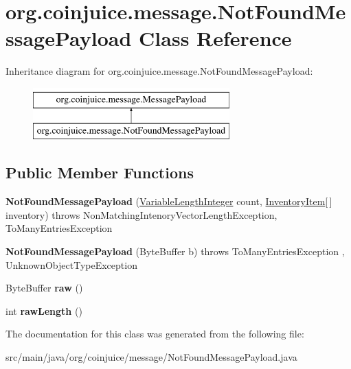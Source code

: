 \hypertarget{classorg_1_1coinjuice_1_1message_1_1_not_found_message_payload}{\section{org.\-coinjuice.\-message.\-Not\-Found\-Message\-Payload Class Reference}
\label{classorg_1_1coinjuice_1_1message_1_1_not_found_message_payload}
}
Inheritance diagram for org.\-coinjuice.\-message.\-Not\-Found\-Message\-Payload\-:\begin{figure}[H]
\begin{center}
\leavevmode
\includegraphics[height=2.000000cm]{classorg_1_1coinjuice_1_1message_1_1_not_found_message_payload}
\end{center}
\end{figure}
\subsection*{Public Member Functions}
\begin{DoxyCompactItemize}
\item 
\hypertarget{classorg_1_1coinjuice_1_1message_1_1_not_found_message_payload_a4a0163a21a24f309243193a046663433}{{\bfseries Not\-Found\-Message\-Payload} (\hyperlink{classorg_1_1coinjuice_1_1message_1_1field_1_1_variable_length_integer}{Variable\-Length\-Integer} count, \hyperlink{classorg_1_1coinjuice_1_1message_1_1field_1_1_inventory_item}{Inventory\-Item}\mbox{[}$\,$\mbox{]} inventory)  throws Non\-Matching\-Intenory\-Vector\-Length\-Exception, To\-Many\-Entries\-Exception }\label{classorg_1_1coinjuice_1_1message_1_1_not_found_message_payload_a4a0163a21a24f309243193a046663433}

\item 
\hypertarget{classorg_1_1coinjuice_1_1message_1_1_not_found_message_payload_a57526b7b6cc8c7cc61608f9b6b698fdc}{{\bfseries Not\-Found\-Message\-Payload} (Byte\-Buffer b)  throws To\-Many\-Entries\-Exception , Unknown\-Object\-Type\-Exception}\label{classorg_1_1coinjuice_1_1message_1_1_not_found_message_payload_a57526b7b6cc8c7cc61608f9b6b698fdc}

\item 
\hypertarget{classorg_1_1coinjuice_1_1message_1_1_not_found_message_payload_a82e3f09076366a8a0f33b7e9260d3c51}{Byte\-Buffer {\bfseries raw} ()}\label{classorg_1_1coinjuice_1_1message_1_1_not_found_message_payload_a82e3f09076366a8a0f33b7e9260d3c51}

\item 
\hypertarget{classorg_1_1coinjuice_1_1message_1_1_not_found_message_payload_a751293b4ba71ae0a3e49a39581e3dfc7}{int {\bfseries raw\-Length} ()}\label{classorg_1_1coinjuice_1_1message_1_1_not_found_message_payload_a751293b4ba71ae0a3e49a39581e3dfc7}

\end{DoxyCompactItemize}


The documentation for this class was generated from the following file\-:\begin{DoxyCompactItemize}
\item 
src/main/java/org/coinjuice/message/Not\-Found\-Message\-Payload.\-java\end{DoxyCompactItemize}
